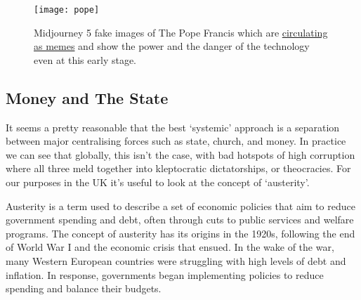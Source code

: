 \begin{figure}
  \centering
    \texttt{[image: pope]}
  \caption{Midjourney 5 fake images of The Pope Francis which are \href{https://www.reddit.com/r/midjourney/comments/120vhdc/the_pope_drip/}{circulating as memes} and show the power and the danger of the technology even at this early stage.}
  \label{fig:pope}
\end{figure}
\subsection{Money and The State}
It seems a pretty reasonable that the best `systemic' approach is a separation between major centralising forces such as state, church, and money. In practice we can see that globally, this isn't the case, with bad hotspots of high corruption where all three meld together into kleptocratic dictatorships, or theocracies. For our purposes in the UK it's useful to look at the concept of `austerity'.\par
Austerity is a term used to describe a set of economic policies that aim to reduce government spending and debt, often through cuts to public services and welfare programs. The concept of austerity has its origins in the 1920s, following the end of World War I and the economic crisis that ensued. In the wake of the war, many Western European countries were struggling with high levels of debt and inflation. In response, governments began implementing policies to reduce spending and balance their budgets.\par
